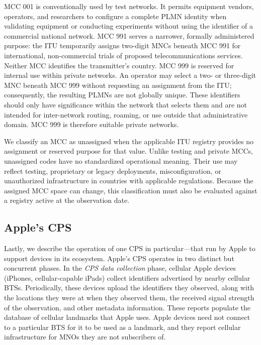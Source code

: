 MCC 001 is conventionally used by test networks. It permits equipment vendors,
operators, and researchers to configure a complete \ac{PLMN} identity when
validating equipment or conducting experiments without using the identifier of a
commercial national network. MCC 991 serves a narrower, formally administered
purpose: the \ac{ITU} temporarily assigns two-digit MNCs beneath MCC 991 for
international, non-commercial trials of proposed telecommunications services.
Neither MCC identifies the transmitter's country. MCC 999 is reserved for
internal use within private networks. An operator may select a two- or
three-digit MNC beneath MCC 999 without requesting an assignment from the
\ac{ITU}; consequently, the resulting \acp{PLMN} are not globally unique. These
identifiers should only have significance within the network that selects them
and are not intended for inter-network routing, roaming, or use outside that
administrative domain. MCC 999 is therefore suitable private networks.

We classify an MCC as unassigned when the applicable \ac{ITU} registry provides
no assignment or reserved purpose for that value. Unlike testing and private
MCCs, unassigned codes have no standardized operational meaning. Their use may
reflect testing, proprietary or legacy deployments, misconfiguration, or
unauthorized infrastructure in countries with applicable regulations. Because
the assigned MCC space can change, this classification must also be evaluated
against a registry active at the observation date.

\subsection{Apple's \ac{CPS}}
\label{sec:cps}

Lastly, we describe the operation of one \ac{CPS} in particular---that run by
Apple to support devices in its ecosystem. Apple's \ac{CPS} operates in two
distinct but concurrent phases. In the \emph{CPS data collection} phase, cellular
Apple devices (\eg iPhones, cellular-capable iPads) collect identifiers
advertised by nearby cellular \acp{BTS}. Periodically, these devices upload
the identifiers they observed, along with the locations they were at when they
observed them, the received signal strength of the observation, and other
metadata information. These reports populate the database of cellular landmarks
that Apple uses. Apple devices need not connect to a particular \ac{BTS} for
it to be used as a landmark, and they report cellular infrastructure for
\acp{MNO} they are not subscribers of.

